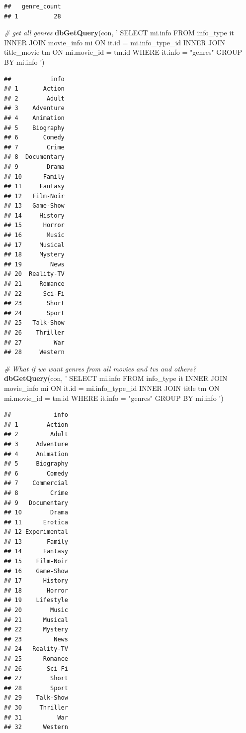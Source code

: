 \documentclass[]{article}
\newenvironment{Shaded}{\begin{snugshade}}{\end{snugshade}}
\newcommand{\KeywordTok}[1]{\textcolor[rgb]{0.13,0.29,0.53}{\textbf{{#1}}}}
\newcommand{\StringTok}[1]{\textcolor[rgb]{0.31,0.60,0.02}{{#1}}}
\newcommand{\CommentTok}[1]{\textcolor[rgb]{0.56,0.35,0.01}{\textit{{#1}}}}
\newcommand{\NormalTok}[1]{{#1}}
\begin{document}
\begin{verbatim}
##   genre_count
## 1          28
\end{verbatim}

\begin{Shaded}
\begin{Highlighting}[]
\CommentTok{# get all genres}
\KeywordTok{dbGetQuery}\NormalTok{(con, }\StringTok{'}
\StringTok{           SELECT mi.info}
\StringTok{           FROM info_type it INNER JOIN movie_info mi ON it.id = mi.info_type_id}
\StringTok{              INNER JOIN title_movie tm ON mi.movie_id = tm.id}
\StringTok{           WHERE it.info = "genres"}
\StringTok{           GROUP BY mi.info}
\StringTok{           '}\NormalTok{)}
\end{Highlighting}
\end{Shaded}

\begin{verbatim}
##           info
## 1       Action
## 2        Adult
## 3    Adventure
## 4    Animation
## 5    Biography
## 6       Comedy
## 7        Crime
## 8  Documentary
## 9        Drama
## 10      Family
## 11     Fantasy
## 12   Film-Noir
## 13   Game-Show
## 14     History
## 15      Horror
## 16       Music
## 17     Musical
## 18     Mystery
## 19        News
## 20  Reality-TV
## 21     Romance
## 22      Sci-Fi
## 23       Short
## 24       Sport
## 25   Talk-Show
## 26    Thriller
## 27         War
## 28     Western
\end{verbatim}

\begin{Shaded}
\begin{Highlighting}[]
\CommentTok{# What if we want genres from all movies and tvs and others?}
\KeywordTok{dbGetQuery}\NormalTok{(con, }\StringTok{'}
\StringTok{           SELECT mi.info}
\StringTok{           FROM info_type it INNER JOIN movie_info mi ON it.id = mi.info_type_id}
\StringTok{              INNER JOIN title tm ON mi.movie_id = tm.id}
\StringTok{           WHERE it.info = "genres"}
\StringTok{           GROUP BY mi.info}
\StringTok{           '}\NormalTok{)}
\end{Highlighting}
\end{Shaded}

\begin{verbatim}
##            info
## 1        Action
## 2         Adult
## 3     Adventure
## 4     Animation
## 5     Biography
## 6        Comedy
## 7    Commercial
## 8         Crime
## 9   Documentary
## 10        Drama
## 11      Erotica
## 12 Experimental
## 13       Family
## 14      Fantasy
## 15    Film-Noir
## 16    Game-Show
## 17      History
## 18       Horror
## 19    Lifestyle
## 20        Music
## 21      Musical
## 22      Mystery
## 23         News
## 24   Reality-TV
## 25      Romance
## 26       Sci-Fi
## 27        Short
## 28        Sport
## 29    Talk-Show
## 30     Thriller
## 31          War
## 32      Western
\end{verbatim}
\end{document}
